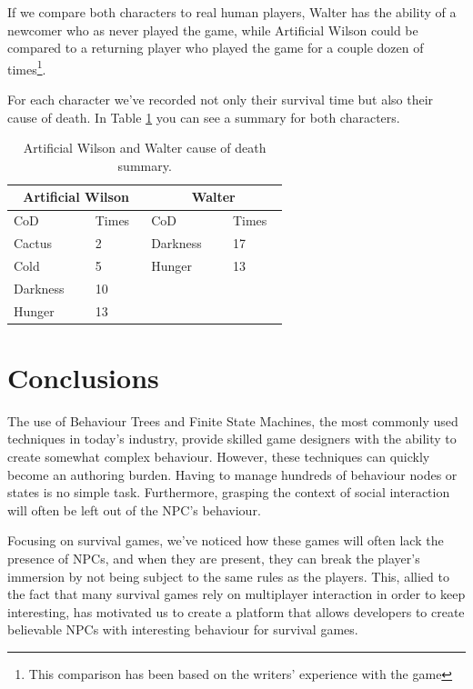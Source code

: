 If we compare both characters to real human players, Walter has the ability of a newcomer who as never played the game, while Artificial Wilson could be compared to a returning player who played the game for a couple dozen of times\footnote{This comparison has been based on the writers' experience with the game}.

For each character we've recorded not only their survival time but also their cause of death.
In Table \ref{tab:cod} you can see a summary for both characters.

\begin{table}[htb]
	\centering
    \caption{Artificial Wilson and Walter cause of death summary.}
    \label{tab:cod}
    \begin{tabular}{ | p{0.2\linewidth} | p{0.1\linewidth} | p{0.2\linewidth} | p{0.1\linewidth} | }
        \hline 
        \multicolumn{2}{|c|}{Artificial Wilson} & \multicolumn{2}{|c|}{Walter} \\ \hline 
        CoD & Times & CoD & Times \\ \hline
        Cactus & 2 & Darkness & 17 \\ \hline
        Cold & 5 & Hunger & 13 \\ \hline
        Darkness & 10 & & \\ \hline
        Hunger & 13 & & \\ \hline
    \end{tabular}
\end{table}


\section{Conclusions}

The use of Behaviour Trees and Finite State Machines, the most commonly used techniques in today's industry, provide skilled game designers with the ability to create somewhat complex behaviour.
However, these techniques can quickly become an authoring burden.
Having to manage hundreds of behaviour nodes or states is no simple task.
Furthermore, grasping the context of social interaction will often be left out of the NPC's behaviour.

Focusing on survival games, we've noticed how these games will often lack the presence of NPCs, and when they are present, they can break the player's immersion by not being subject to the same rules as the players.
This, allied to the fact that many survival games rely on multiplayer interaction in order to keep interesting, has motivated us to create a platform that allows developers to create believable NPCs with interesting behaviour for survival games.

